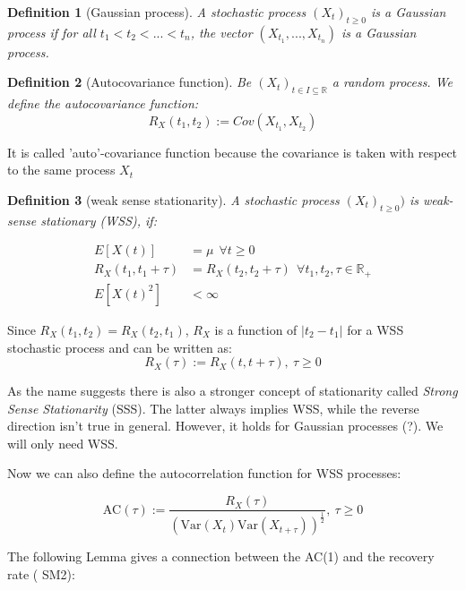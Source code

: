 \documentclass[%
thesis=student,%
coverpage=false,%
titlepage=false,%
headmarks=true, %
english,%
font=libertine, %
math=newpxtx, %
BCOR=5mm,%
coverBCOR=11mm%
]{tumbook}
\newtheorem{definition}{Definition}[section]
\begin{document}
\begin{definition}[Gaussian process]
    A stochastic process $(X_{t})_{t\geq 0}$ is a Gaussian process if for all $t_{1} < t_{2} < ... < t_{n}$, the vector $(X_{t_{1}},...,X_{t_{n}})$ is a Gaussian process.
\end{definition}


\begin{definition}[Autocovariance function]
Be $(X_{t})_{t \in I \subseteq \mathbb{R}}$ a random process. We define the autocovariance function: 
\[
R_{X}(t_{1},t_{2}) := Cov(X_{t_{1}},X_{t_{2}})
\]    
\end{definition}

It is called 'auto'-covariance function because the covariance is taken with respect to the same process $X_{t}$


\begin{definition}[weak sense stationarity]
A stochastic process $(X_{t})_{t\geq 0})$ is weak-sense stationary (WSS), if:

\begin{subequations}
    \begin{align}
        E[X(t)] &= \mu \ \ \forall t \geq 0 \\
        R_{X}(t_{1},t_{1} + \tau) &= R_{X}(t_{2},t_{2} + \tau) \ \ \forall t_{1},t_{2},\tau \in \mathbb{R}_{+} \\
        E[X(t)^2]&<\infty
    \end{align}
\end{subequations}   
\end{definition}

Since $R_{X}(t_{1},t_{2}) = R_{X}(t_{2},t_{1})$, $R_{X}$ is a function of $\lvert t_{2} - t_{1} \rvert$ for a WSS stochastic process and can be written as:
\[
R_{X}(\tau) := R_{X}(t,t + \tau), \ \tau \geq 0
\]

As the name suggests there is also a stronger concept of stationarity called \textit{Strong Sense Stationarity} (SSS). The latter always implies WSS, while the reverse direction isn't true in general. However, it holds for Gaussian processes (?). We will only need WSS.

Now we can also define the autocorrelation function for WSS processes:

\[
\text{AC}(\tau) := \frac{R_{X}(\tau)}{(\text{Var}(X_{t})\text{Var}(X_{t+\tau}))^{\frac{1}{2}}}, \ \tau \geq 0
\]

The following Lemma gives a connection between the AC(1) and the recovery rate (\cite{Morr:2024} SM2): 
\end{document}
